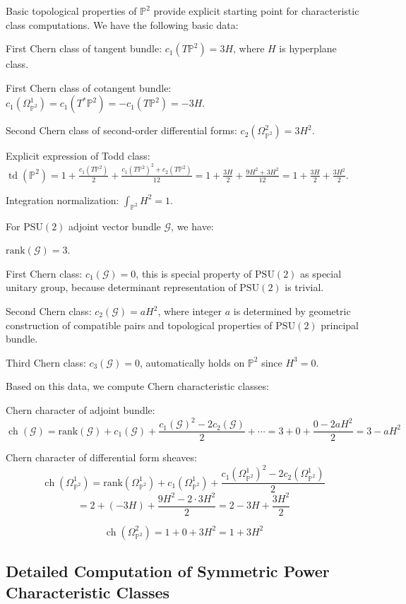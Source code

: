 \documentclass[a4paper,12pt]{extarticle}
\newcommand{\ch}{\operatorname{ch}}
\newcommand{\td}{\operatorname{td}}
\theoremstyle{definition}
\begin{document}
Basic topological properties of $\mathbb{P}^2$ provide explicit starting point for characteristic class computations\cite{milnor1974characteristic}. We have the following basic data:

First Chern class of tangent bundle: $c_1(T\mathbb{P}^2) = 3H$, where $H$ is hyperplane class.

First Chern class of cotangent bundle: $c_1(\Omega^1_{\mathbb{P}^2}) = c_1(T^*\mathbb{P}^2) = -c_1(T\mathbb{P}^2) = -3H$.

Second Chern class of second-order differential forms: $c_2(\Omega^2_{\mathbb{P}^2}) = 3H^2$.

Explicit expression of Todd class: $\td(\mathbb{P}^2) = 1 + \frac{c_1(T\mathbb{P}^2)}{2} + \frac{c_1(T\mathbb{P}^2)^2 + c_2(T\mathbb{P}^2)}{12} = 1 + \frac{3H}{2} + \frac{9H^2 + 3H^2}{12} = 1 + \frac{3H}{2} + \frac{3H^2}{2}$.

Integration normalization: $\int_{\mathbb{P}^2} H^2 = 1$.

For $\text{PSU}(2)$ adjoint vector bundle $\mathcal{G}$, we have:

$\mathrm{rank}(\mathcal{G}) = 3$.

First Chern class: $c_1(\mathcal{G}) = 0$, this is special property of $\text{PSU}(2)$ as special unitary group, because determinant representation of $\text{PSU}(2)$ is trivial.

Second Chern class: $c_2(\mathcal{G}) = a H^2$, where integer $a$ is determined by geometric construction of compatible pairs and topological properties of $\text{PSU}(2)$ principal bundle.

Third Chern class: $c_3(\mathcal{G}) = 0$, automatically holds on $\mathbb{P}^2$ since $H^3 = 0$.

Based on this data, we compute Chern characteristic classes:

Chern character of adjoint bundle:
$$\ch(\mathcal{G}) = \mathrm{rank}(\mathcal{G}) + c_1(\mathcal{G}) + \frac{c_1(\mathcal{G})^2 - 2c_2(\mathcal{G})}{2} + \cdots = 3 + 0 + \frac{0 - 2aH^2}{2} = 3 - aH^2$$

Chern character of differential form sheaves:
$$\ch(\Omega^1_{\mathbb{P}^2}) = \mathrm{rank}(\Omega^1_{\mathbb{P}^2}) + c_1(\Omega^1_{\mathbb{P}^2}) + \frac{c_1(\Omega^1_{\mathbb{P}^2})^2 - 2c_2(\Omega^1_{\mathbb{P}^2})}{2}$$
$$= 2 + (-3H) + \frac{9H^2 - 2 \cdot 3H^2}{2} = 2 - 3H + \frac{3H^2}{2}$$

$$\ch(\Omega^2_{\mathbb{P}^2}) = 1 + 0 + 3H^2 = 1 + 3H^2$$

\subsection{Detailed Computation of Symmetric Power Characteristic Classes}
\end{document}
